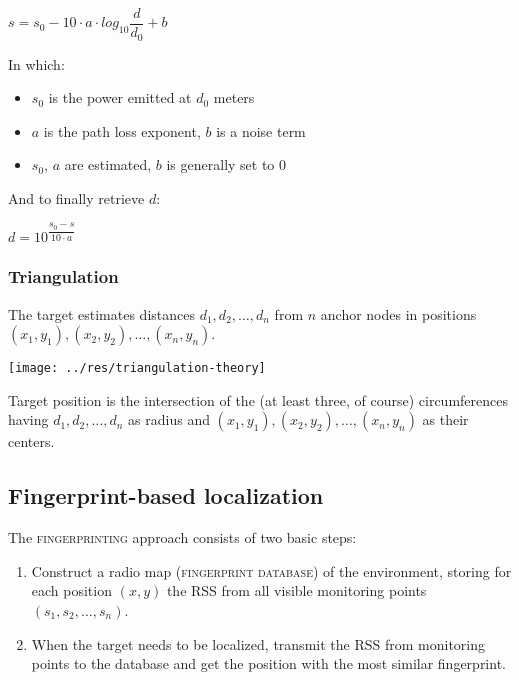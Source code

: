\documentclass[a4paper,11pt]{article} %
\begin{document}
\medskip

$s = s_0 - 10 \cdot a \cdot log_{10} \dfrac{d}{d_0} + b$

\medskip

In which:

\begin{itemize}
    \item $s_0$ is the power emitted at $d_0$ meters
    \item $a$ is the path loss exponent, $b$ is a noise term
    \item $s_0$, $a$ are estimated, $b$ is generally set to 0
\end{itemize}

\smallskip

And to finally retrieve $d$:

\medskip

$d = 10^{\dfrac{s_0-s}{10 \cdot a}}$

\subsubsection{Triangulation}\label{triangulation}

The target estimates distances $d_1, d_2, \dots, d_n$ from $n$ anchor nodes in positions $\left(x_1, y_1\right), \left(x_2, y_2\right), \dots, \left(x_n, y_n\right)$.

\smallskip

\begin{center}
    \texttt{[image: ../res/triangulation-theory]}
\end{center}

\smallskip

Target position is the intersection of the (at least three, of course) circumferences having $d_1, d_2, \dots, d_n$ as radius and $\left(x_1, y_1\right), \left(x_2, y_2\right), \dots, \left(x_n, y_n\right)$ as their centers.

\subsection{Fingerprint-based localization}

The \textsc{fingerprinting} approach consists of two basic steps:

\begin{enumerate}
    \item Construct a radio map (\textsc{fingerprint database}) of the environment, storing for each position $\left(x, y\right)$ the RSS from all visible monitoring points $\left(s_1, s_2, \dots, s_n\right)$.
    \item When the target needs to be localized, transmit the \textsc{RSS} from monitoring points to the database and get the position with the most similar fingerprint.
\end{enumerate}
\end{document}
